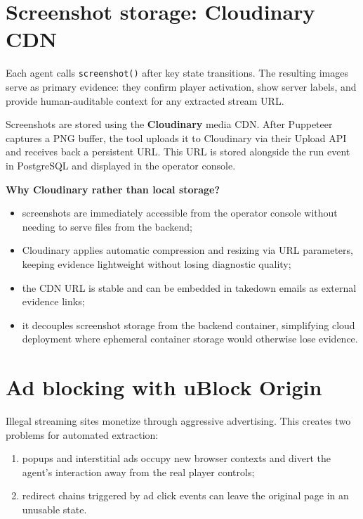 \section{Screenshot storage: Cloudinary CDN}

Each agent calls \texttt{screenshot()} after key state transitions. The resulting
images serve as primary evidence: they confirm player activation, show server labels,
and provide human-auditable context for any extracted stream URL.

Screenshots are stored using the \textbf{Cloudinary} media CDN. After Puppeteer
captures a PNG buffer, the tool uploads it to Cloudinary via their Upload API and
receives back a persistent URL. This URL is stored alongside the run event in
PostgreSQL and displayed in the operator console.

\textbf{Why Cloudinary rather than local storage?}
\begin{itemize}
  \item screenshots are immediately accessible from the operator console without
    needing to serve files from the backend;
  \item Cloudinary applies automatic compression and resizing via URL parameters,
    keeping evidence lightweight without losing diagnostic quality;
  \item the CDN URL is stable and can be embedded in takedown emails as external
    evidence links;
  \item it decouples screenshot storage from the backend container, simplifying
    cloud deployment where ephemeral container storage would otherwise lose evidence.
\end{itemize}

\section{Ad blocking with uBlock Origin}

Illegal streaming sites monetize through aggressive advertising. This creates two
problems for automated extraction:

\begin{enumerate}
  \item popups and interstitial ads occupy new browser contexts and divert the agent's
    interaction away from the real player controls;
  \item redirect chains triggered by ad click events can leave the original page
    in an unusable state.
\end{enumerate}

